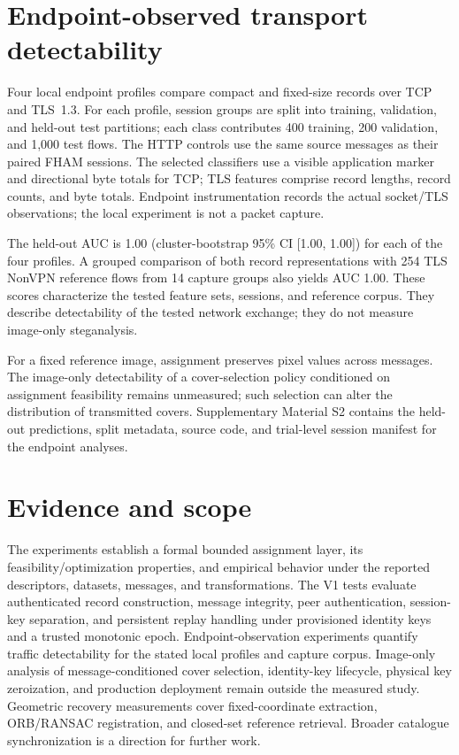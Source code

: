 ﻿\documentclass[11pt,a4paper]{article}
\begin{document}
\section{Endpoint-observed transport detectability}
Four local endpoint profiles compare compact and fixed-size records over TCP and TLS~1.3. For each profile, session groups are split into training, validation, and held-out test partitions; each class contributes 400 training, 200 validation, and 1,000 test flows. The HTTP controls use the same source messages as their paired FHAM sessions. The selected classifiers use a visible application marker and directional byte totals for TCP; TLS features comprise record lengths, record counts, and byte totals. Endpoint instrumentation records the actual socket/TLS observations; the local experiment is not a packet capture.

The held-out AUC is 1.00 (cluster-bootstrap 95\% CI [1.00, 1.00]) for each of the four profiles. A grouped comparison of both record representations with 254 TLS NonVPN reference flows from 14 capture groups also yields AUC 1.00. These scores characterize the tested feature sets, sessions, and reference corpus. They describe detectability of the tested network exchange; they do not measure image-only steganalysis.

For a fixed reference image, assignment preserves pixel values across messages. The image-only detectability of a cover-selection policy conditioned on assignment feasibility remains unmeasured; such selection can alter the distribution of transmitted covers. Supplementary Material S2 contains the held-out predictions, split metadata, source code, and trial-level session manifest for the endpoint analyses.

\section{Evidence and scope}
The experiments establish a formal bounded assignment layer, its feasibility/optimization properties, and empirical behavior under the reported descriptors, datasets, messages, and transformations. The V1 tests evaluate authenticated record construction, message integrity, peer authentication, session-key separation, and persistent replay handling under provisioned identity keys and a trusted monotonic epoch. Endpoint-observation experiments quantify traffic detectability for the stated local profiles and capture corpus. Image-only analysis of message-conditioned cover selection, identity-key lifecycle, physical key zeroization, and production deployment remain outside the measured study. Geometric recovery measurements cover fixed-coordinate extraction, ORB/RANSAC registration, and closed-set reference retrieval. Broader catalogue synchronization is a direction for further work.
\end{document}
